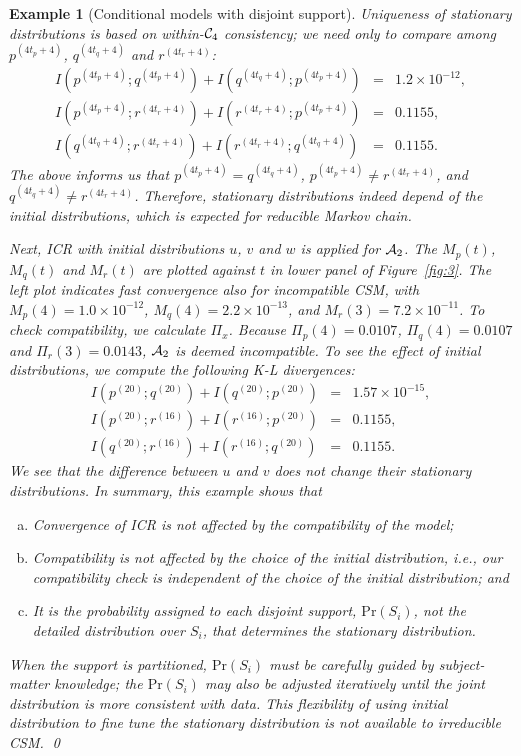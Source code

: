 \documentclass[12pt,a4paper]{article}
\newtheorem{example}{Example}
\begin{document}
\begin{example} [Conditional models with disjoint support]
Uniqueness of stationary distributions is based on within-${\cal C}_4$ consistency; we need only to compare among $p^{(4t_p+4)}$, $q^{(4t_q+4)}$ and $r^{(4t_r+4)}$:
\begin{eqnarray*}
I(p^{(4t_p+4)};q^{(4t_p+4)})+I(q^{(4t_q+4)};p^{(4t_p+4)})&=&1.2\times 10^{-12},\\
I(p^{(4t_p+4)};r^{(4t_r+4)})+I(r^{(4t_r+4)};p^{(4t_p+4)})&=&0.1155,\\
I(q^{(4t_q+4)};r^{(4t_r+4)})+I(r^{(4t_r+4)};q^{(4t_q+4)})&=&0.1155.
\end{eqnarray*}
The above  informs us that $p^{(4t_p+4)}=q^{(4t_q+4)}$, $p^{(4t_p+4)} \ne r^{(4t_r+4)}$, and $q^{(4t_q+4)}\ne r^{(4t_r+4)}$.
Therefore, stationary distributions indeed depend of the initial distributions, which is expected for reducible Markov chain.

Next, ICR  with  initial distributions $u$, $v$ and $w$ is applied for ${\cal A}_2$.
The $M_p(t)$, $M_q(t)$ and $M_r(t)$ are plotted against $t$ in lower panel of Figure~\ref{fig:3}.
The left plot  indicates fast convergence also for incompatible CSM, with $M_p(4)=1.0\times 10^{-12}$, $M_q(4)=2.2\times 10^{-13}$, and $M_r(3)=7.2\times 10^{-11}$.
To check compatibility, we calculate $\Pi_x$.  Because $\Pi_p(4)=0.0107$, $\Pi_q(4)=0.0107$ and $\Pi_r(3)=0.0143$,  ${\cal A}_2$ is deemed incompatible.
To see the effect of initial distributions, we compute the following K-L divergences:
\begin{eqnarray*}
I(p^{(20)};q^{(20)})+I(q^{(20)};p^{(20)})&=&1.57\times 10^{-15},\\
I(p^{(20)};r^{(16)})+I(r^{(16)};p^{(20)})&=&0.1155,\\
I(q^{(20)};r^{(16)})+I(r^{(16)};q^{(20)})&=&0.1155.
\end{eqnarray*}
We see that the difference between $u$ and $v$ does not change their stationary distributions.
In summary, this example shows that
\begin{enumerate}[(a)]
  \item  Convergence of ICR is not affected by the compatibility of the model;
  \item  Compatibility is not affected by the choice of the initial distribution, i.e., our compatibility check is independent of the choice of the initial distribution; and
  \item  It is the probability assigned to each disjoint support, $\mbox{Pr}(S_i)$, not the detailed distribution over $S_i$, that determines the stationary distribution.
\end{enumerate}
When the support is partitioned, $\mbox{Pr}(S_i)$ must be carefully guided by  subject-matter knowledge; the $\mbox{Pr}(S_i)$ may also be adjusted iteratively until the joint distribution is more consistent with data. This flexibility of using initial distribution to fine tune the stationary distribution is not available to irreducible CSM. \qed
\end{example}
\end{document}
